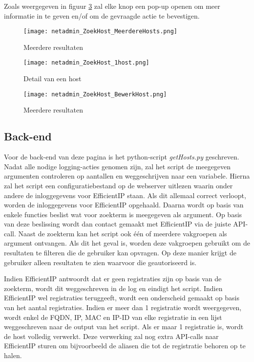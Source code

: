 Zoals weergegeven in figuur \ref{fig:netadmin_ZoekHost_BewerkHost} zal elke knop een pop-up openen om meer informatie in te geven en/of om de gevraagde actie te bevestigen.
\begin{figure}[H]
    \texttt{[image: netadmin\_ZoekHost\_MeerdereHosts.png]}
    \caption{Meerdere resultaten}
    \label{fig:netadmin_ZoekHost_MeerdereHosts}
\end{figure}
\begin{figure}[H]
    \texttt{[image: netadmin\_ZoekHost\_1host.png]}
    \caption{Detail van een host}
    \label{fig:netadmin_ZoekHost_1host}
\end{figure}
\begin{figure}[H]
    \texttt{[image: netadmin\_ZoekHost\_BewerkHost.png]}
    \caption{Meerdere resultaten}
    \label{fig:netadmin_ZoekHost_BewerkHost}
\end{figure}
\subsection{Back-end}
Voor de back-end van deze pagina is het python-script \textit{getHosts.py} geschreven. Nadat alle nodige logging-acties genomen zijn, zal het script de meegegeven argumenten controleren  op aantallen en weggeschrijven naar een variabele. Hierna zal het script een configuratiebestand op de webserver uitlezen waarin onder andere de inloggegevens voor EfficientIP staan. Als dit allemaal correct verloopt, worden de inloggegevens voor EfficientIP opgehaald. Daarna wordt op basis van enkele functies beslist wat voor zoekterm is meegegeven als argument. Op basis van deze beslissing wordt dan contact gemaakt met EfficientIP via de juiste API-call. Naast de zoekterm kan het script ook één of meerdere vakgroepen als argument ontvangen. Als dit het geval is, worden deze vakgroepen gebruikt om de resultaten te filteren die de gebruiker kan opvragen. Op deze manier krijgt de gebruiker alleen resultaten te zien waarvoor die geautoriseerd is.

Indien EfficientIP antwoordt dat er geen registraties zijn op basis van de zoekterm, wordt dit weggeschreven in de log en eindigt het script. Indien EfficientIP wel registraties teruggeeft, wordt een onderscheid gemaakt op basis van het aantal registraties.
Indien er meer dan 1 registratie wordt weergegeven, wordt enkel de FQDN, IP, MAC en IP-ID van elke registratie in een lijst weggeschreven naar de output van het script. Als er maar 1 registratie is, wordt de host volledig verwerkt. Deze verwerking zal nog extra API-calls naar EfficientIP sturen om bijvoorbeeld de aliasen die tot de registratie behoren op te halen.

